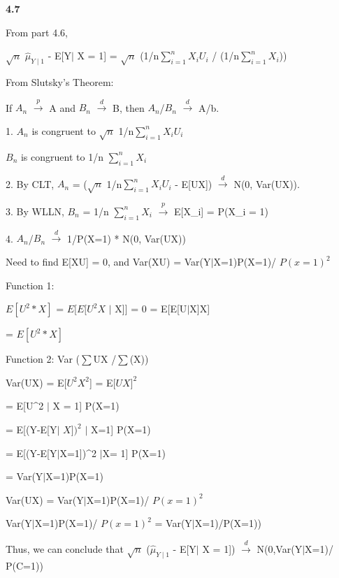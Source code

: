 \textbf{4.7}

From part 4.6,

$\sqrt{n}$ $\hat{\mu}_{Y\mid1}$ - E[Y$\mid$ X = 1] = $\sqrt{n}$ (1/n$\sum^n_{i=1} X_{i}U_{i}$ / (1/n$\sum^n_{i=1} X_{i}$))

From Slutsky's Theorem:

If $A_{n}$ $\xrightarrow{p}$ A and $B_{n}$ $\xrightarrow{d}$ B, then $A_{n}$/$B_{n}$  $\xrightarrow{d}$ A/b.

1. $A_{n}$ is congruent to $\sqrt{n}$ 1/n$\sum^n_{i=1} X_{i}U_{i}$

 $B_{n}$ is congruent to 1/n $\sum^n_{i=1} X_{i}$

2. By CLT, $A_{n}$ = ($\sqrt{n}$ 1/n$\sum^n_{i=1} X_{i}U_{i}$ - E[UX]) $\xrightarrow{d}$ N(0, Var(UX)).

3. By WLLN, $B_{n}$ = 1/n $\sum^n_{i=1} X_{i}$ $\xrightarrow{p}$ E[X_{i}] = P(X_{i} = 1)

4. $A_{n}$/$B_{n}$ $\xrightarrow{d}$ 1/P(X=1) * N(0, Var(UX))

Need to find E[XU] = 0, and Var(XU) = Var(Y$\mid$X=1)P(X=1)/ $P(x=1)^2$

Function 1: 

$E[U^2 * X]$ = $E[E[U^2 X$ $\mid$ X]] = 0 = E[E[U$\mid$X]X]

= $E[U^2 * X]$

Function 2: Var ($\sum$UX /$\sum$(X))

Var(UX) = E[$U^2 X^2$] = E[$UX]^2$


= E[U^2 $\mid$ X = 1] P(X=1)

= E[(Y-E[Y$\mid$ $X])^2$ $\mid$ X=1] P(X=1)

= E[(Y-E[Y$\mid$X=1])^2 $\mid$X= 1] P(X=1)

= Var(Y$\mid$X=1)P(X=1)

Var(UX) = Var(Y$\mid$X=1)P(X=1)/ $P(x=1)^2$

Var(Y$\mid$X=1)P(X=1)/ $P(x=1)^2$ = Var(Y$\mid$X=1)/P(X=1))

Thus, we can conclude that $\sqrt{n}$ ($\hat{\mu}_{Y\mid1}$ - E[Y$\mid$ X = 1]) $\xrightarrow{d}$ N(0,Var(Y$\mid$X=1)/ P(C=1))

